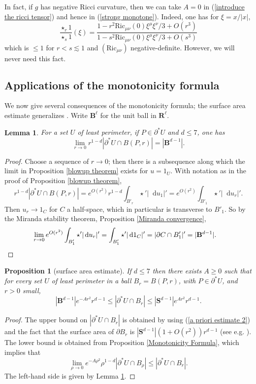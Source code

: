 \documentclass[reqno,12pt,letterpaper]{amsart}
\newcommand{\RR}{\mathbf{R}}
\newcommand{\Sph}{\mathbf S}
\newcommand{\Ball}{\mathbf{B}}
\newcommand{\Ric}{\mathrm{Ric}}
\newcommand*\dif{\mathop{}\!\mathrm{d}}
\newtheorem{lemma}[theorem]{Lemma}
\newtheorem{proposition}[theorem]{Proposition}
\theoremstyle{definition}
\numberwithin{equation}{section}
\begin{document}
In fact, if $g$ has negative Ricci curvature, then we can take $A = 0$ in (\ref{introduce the ricci tensor}) and hence in (\ref{strong monotone}). Indeed, one has for $\xi = x/|x|$,
$$\frac{\star_r 1}{\star_s 1}(\xi) = \frac{1 - r^2 \Ric_{\mu \nu}(0) \xi^\mu \xi^\nu/3 + O(r^3)}{1 - s^2 \Ric_{\mu \nu}(0) \xi^\mu \xi^\nu/3 + O(s^3)}$$
which is $\leq 1$ for $r < s \lesssim 1$ and $(\Ric_{\mu\nu})$ negative-definite.
However, we will never need this fact.

\subsection{Applications of the monotonicity formula}
We now give several consequences of the monotonicity formula; the surface area estimate generalizes \cite[Remark 5.13]{Giusti77}.
Write $\Ball^\ell$ for the unit ball in $\RR^\ell$.

\begin{lemma}\label{least perimeter minimal size}
For a set $U$ of least perimeter, if $P \in \partial^* U$ and $d \leq 7$, one has
$$\lim_{r \to 0} r^{1 - d} |\partial^* U \cap B(P, r)| = |\Ball^{d - 1}|.$$
\end{lemma}
\begin{proof}
Choose a sequence of $r \to 0$; then there is a subsequence along which the limit in Proposition \ref{blowup theorem} exists for $u = 1_U$.
With notation as in the proof of Proposition \ref{blowup theorem},
$$r^{1 - d} |\partial^* U \cap B(P, r)| = e^{O(r^2)} r^{1 - d}\int_{B'_r} \star'|\dif u_1|' = e^{O(r^2)} \int_{B'_1} \star'|\dif u_r|'.$$
Then $u_r \to 1_C$ for $C$ a half-space, which in particular is transverse to $B'_1$.
So by the Miranda stability theorem, Proposition \ref{Miranda convergence},
\begin{align*}
\lim_{r \to 0} e^{O(r^2)} \int_{B'_1} \star'|\dif u_r|' &= \int_{B'_1} \star'|\dif 1_C|' = |\partial C \cap B'_1|' = |\Ball^{d - 1}|. \qedhere
\end{align*}
\end{proof}

\begin{proposition}[surface area estimate]\label{doubling dimension}
If $d \leq 7$ then there exists $A \geq 0$ such that for every set $U$ of least perimeter in a ball $B_r = B(P, r)$, with $P \in \partial^* U$, and $r > 0$ small,
$$|\Ball^{d - 1}|e^{-Ar^2}r^{d - 1} \leq |\partial^*U \cap B_r| \leq |\Sph^{d - 1}|e^{Ar^2} r^{d - 1}.$$
\end{proposition}
\begin{proof}
The upper bound on $|\partial^* U \cap B_r|$ is obtained by using (\ref{a priori estimate 2}) and the fact that the surface area of $\partial B_r$ is $|\Sph^{d - 1}|(1 + O(r^2))r^{d - 1}$ (see e.g. \cite{gray1974volume}).
The lower bound is obtained from Proposition \ref{Monotonicity Formula}, which implies that
$$\lim_{\rho \to 0} e^{-A\rho^2} \rho^{1 - d} |\partial^* U \cap B_\rho| \leq |\partial^* U \cap B_r|.$$
The left-hand side is given by Lemma \ref{least perimeter minimal size}.
\end{proof}
\end{document}

